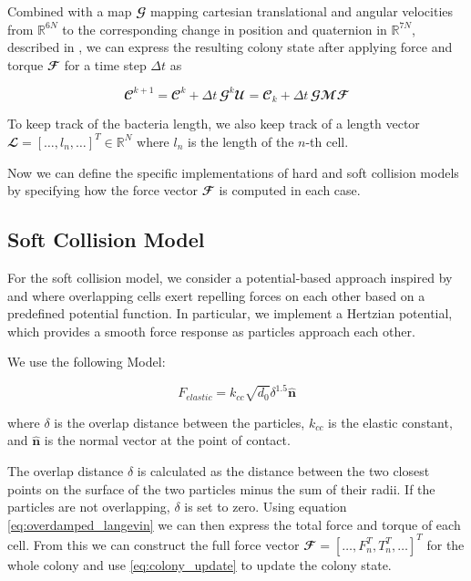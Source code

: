 \documentclass[conference]{IEEEtran}
\begin{document}
Combined with a map $\mathbfcal{G}$ mapping cartesian translational and angular velocities from $\mathbb{R}^{6N}$ to the corresponding change in position and quaternion in $\mathbb{R}^{7N}$, described in \cite{Weady2024}, we can express the resulting colony state after applying force and torque $\mathbfcal{F}$ for a time step $\Delta t$ as

$$
    \mathbfcal{C}^{k+1}  = \mathbfcal{C}^k + \Delta t \, \mathbfcal{G}^k\mathbfcal{U} = \mathbfcal{C}_k + \Delta t \, \mathbfcal{G}\mathbfcal{M} \mathbfcal{F}
$$
\label{eq:colony_update}


To keep track of the bacteria length, we also keep track of a length vector $\mathbfcal{L} = [\dots, l_n, \dots]^T \in \mathbb{R}^{N}$ where $l_n$ is the length of the $n$-th cell.







Now we can define the specific implementations of hard and soft collision models by specifying how the force vector $\mathbfcal{F}$ is computed in each case.

\newpage

\subsection{Soft Collision Model}

For the soft collision model, we consider a potential-based approach inspired by \cite{Warren2019} and \cite{You2018} where overlapping cells exert repelling forces on each other based on a predefined potential function. In particular, we implement a Hertzian potential, which provides a smooth force response as particles approach each other.

We use the following Model:

$$
    F_{elastic} =k_{cc} \sqrt{d_0} \delta^{1.5} \hat{\mathbf{n}}
$$

where $\delta$ is the overlap distance between the particles, $k_{cc}$ is the elastic constant, and $\hat{\mathbf{n}}$ is the normal vector at the point of contact.

The overlap distance $\delta$ is calculated as the distance between the two closest points on the surface of the two particles minus the sum of their radii. If the particles are not overlapping, $\delta$ is set to zero. Using equation \autoref{eq:overdamped_langevin} we can then express the total force and torque of each cell. From this we can construct the full force vector $\mathbfcal{F} = [ \dots, F_n^T, T_n^T, \dots]^T$ for the whole colony and use \autoref{eq:colony_update} to update the colony state.
\end{document}
